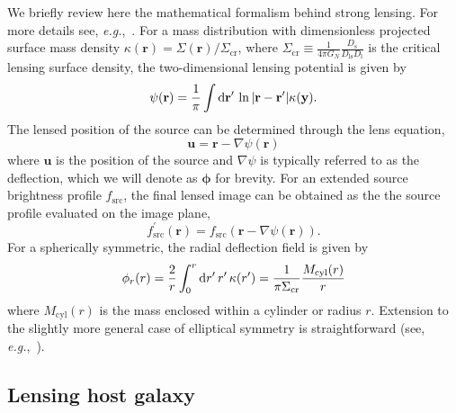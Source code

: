 \documentclass[twocolumn]{aastex62}
\begin{document}
We briefly review here the mathematical formalism behind strong lensing. For more details see, \emph{e.g.},~\cite{2001astro.ph..2341K,1992grle.book.....S}. For a mass distribution with dimensionless projected surface mass density $\kappa(\mathbf{r})=\Sigma(\mathbf{r}) / \Sigma_{\mathrm{cr}}$, where $\Sigma_{\mathrm{cr}}\equiv \frac{1}{4 \pi G_N} \frac{D_{\mathrm{s}}}{D_{\mathrm{ls}} D_{\mathrm{l}}}$ is the critical lensing surface density, the two-dimensional lensing potential is given by
\begin{equation}
\psi(\mathbf{r})=\frac{1}{\pi} \int \diff \mathbf{r^\prime}\,\ln |\mathbf{r}-\mathbf{r^\prime}| \kappa(\mathbf{y}) .
\end{equation}
The lensed position of the source can be determined through the lens equation,
\begin{equation}
\mathbf{u}=\mathbf{r}-\nabla \psi(\mathbf{r})
\end{equation}
where $\mathbf{u}$ is the position of the source and $\nabla \psi$ is typically referred to as the deflection, which we will denote as $\boldsymbol\phi$ for brevity. For an extended source brightness profile $f_\mathrm{src}$, the final lensed image can be obtained as the the source profile evaluated on the image plane,
\begin{equation}
f^\prime_\mathrm{src}(\mathbf r) = f_\mathrm{src}\left(\mathbf{r}-\nabla \psi(\mathbf{r})\right).
\end{equation}
For a spherically symmetric, the radial deflection field is given by
\begin{equation}
\phi_{r}(r)=\frac{2}{r} \int_{0}^{r}\diff r^\prime\,r^\prime\,\kappa(r^\prime) =\frac{1}{\pi \Sigma_{\mathrm{cr}}} \frac{M_{\mathrm{cyl}}(r)}{r}
\end{equation}
where $M_{\mathrm{cyl}}(r)$ is the mass enclosed within a cylinder or radius $r$. Extension to the slightly more general case of elliptical symmetry is straightforward (see, \emph{e.g.},~\cite{2001astro.ph..2341K}).

\subsection{Lensing host galaxy}
\end{document}
